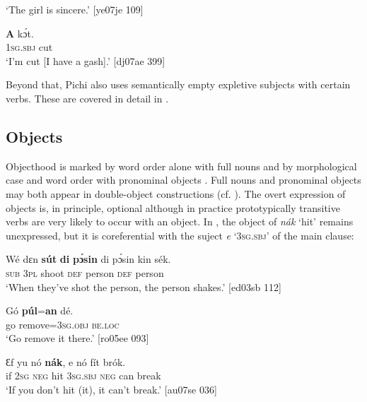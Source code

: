 \glt ‘The girl is sincere.’ [ye07je 109]
\z


\ea%
    \label{ex:key:1044}
    \gll \textbf{A}    kɔ́t.\\
\textsc{1sg.sbj}  cut\\

\glt ‘I’m cut [I have a gash].’ [dj07ae 399]
\z

Beyond that, Pichi also uses semantically empty expletive subjects with certain verbs. These are covered in detail in .

\subsection{Objects}

Objecthood is marked by word order alone with full nouns  and by morphological case and word order with pronominal objects . Full nouns and pronominal objects may both appear in double-object constructions (cf. ). The overt expression of objects is, in principle, optional although in practice prototypically transitive verbs are very likely to occur with an object. In , the object of \textit{nák} ‘hit’ remains unexpressed, but it is coreferential with the suject \textit{e} ‘\textsc{3sg.sbj}’ of the main clause: 


\ea%
    \label{ex:key:1045}
    \gll Wé  dɛn  \textbf{sút}    \textbf{di}  \textbf{pɔ́sin}  di  pɔ́sin  kin  sék.\\
\textsc{sub}  \textsc{3pl}  shoot  \textsc{def}  person  \textsc{def}  person   \\

\glt ‘When they’ve shot the person, the person shakes.’ [ed03sb 112]
\z


\ea%
    \label{ex:key:1046}
    \gll Gó  \textbf{púl}=\textbf{an}      dé.\\
go  remove=\textsc{3sg.obj}  \textsc{be.loc}\\

\glt ‘Go remove it there.’ [ro05ee 093]
\z


\ea%
    \label{ex:key:1047}
    \gll Ɛf  yu  nó  \textbf{nák},    e    nó  fít  brók.\\
if  \textsc{2sg}  \textsc{neg}  hit    \textsc{3sg.sbj}  \textsc{neg}  can  break\\

\glt ‘If you don’t hit (it), it can’t break.’ [au07se 036]
\z

